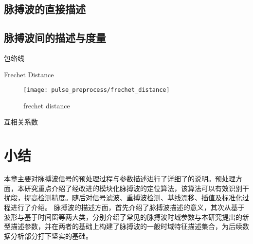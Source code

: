 \subsection{脉搏波的直接描述}
\subsection{脉搏波间的描述与度量}
包络线

Frechet Distance

\begin{figure}[htbp]
    \centering
    \texttt{[image: pulse\_preprocess/frechet\_distance]}
    \caption{\label{fig:frechet distance}frechet distance}
\end{figure}

互相关系数
\section{小结}
本章主要对脉搏波信号的预处理过程与参数描述进行了详细了的说明。预处理方面，本研究重点介绍了经改进的模块化脉搏波的定位算法，该算法可以有效识别干扰段，提高检测精度。随后对信号滤波、重搏波检测、基线漂移、插值及标准化过程进行了介绍。
脉搏波的描述方面，首先介绍了脉搏波描述的意义，其次从基于波形与基于时间窗等两大类，分别介绍了常见的脉搏波时域参数与本研究提出的新型描述参数，并在两者的基础上构建了脉搏波的一般时域特征描述集合，为后续数据分析部分打下坚实的基础。